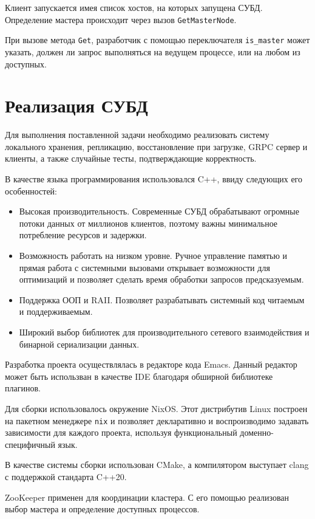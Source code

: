 \documentclass[14pt, russian]{scrartcl}
\begin{document}
Клиент запускается имея список хостов, на которых запущена СУБД. Определение
мастера происходит через вызов \verb|GetMasterNode|.

При вызове метода \verb|Get|, разработчик с помощью переключателя
\verb|is_master| может указать, должен ли запрос выполняться на ведущем
процессе, или на любом из доступных.

\section{Реализация СУБД}

Для выполнения поставленной задачи необходимо реализовать систему локального
хранения, репликацию, восстановление при загрузке, GRPC сервер и клиенты, а
также случайные тесты, подтверждающие корректность.

В качестве языка программирования использовался C++, ввиду следующих его
особенностей:

\begin{itemize}
  \item Высокая производительность. Современные СУБД обрабатывают огромные
        потоки данных от миллионов клиентов, поэтому важны минимальное
        потребление ресурсов и задержки.
  \item Возможность работать на низком уровне. Ручное управление памятью и
        прямая работа с системными вызовами открывает возможности для
        оптимизаций и позволяет сделать время обработки запросов предсказуемым.
  \item Поддержка ООП и RAII. Позволяет разрабатывать системный код читаемым и
        поддерживаемым.
  \item Широкий выбор библиотек для производительного сетевого взаимодействия и
        бинарной сериализации данных.
\end{itemize}

Разработка проекта осуществлялась в редакторе кода Emacs. Данный редактор может
быть использван в качестве IDE благодаря обширной библиотеке плагинов.

Для сборки использовалось окружение NixOS. Этот дистрибутив Linux построен на
пакетном менеджере \verb|nix| и позволяет декларативно и воспроизводимо задавать
зависимости для каждого проекта, используя функциональный доменно-специфичный
язык.

В качестве системы сборки использован CMake, а компилятором выступает clang с
поддержкой стандарта C++20.

ZooKeeper применен для координации кластера. С его помощью реализован выбор
мастера и определение доступных процессов.
\end{document}
